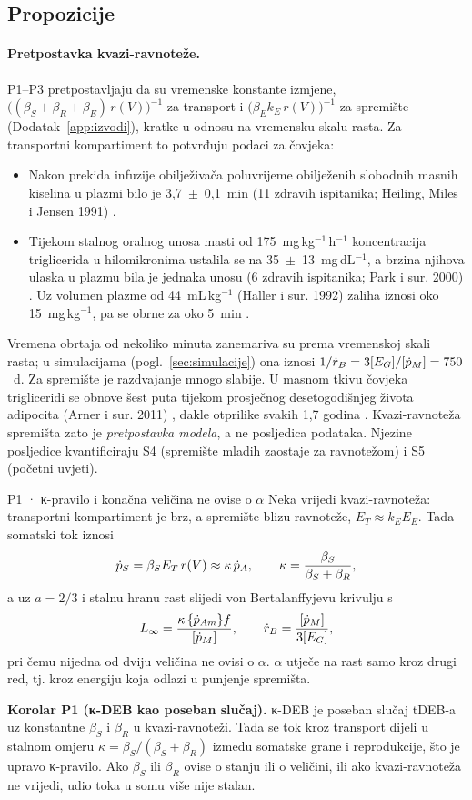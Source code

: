 \subsection{Propozicije}

\paragraph{Pretpostavka kvazi-ravnoteže.} P1–P3 pretpostavljaju da su vremenske konstante izmjene, $\big((\beta_S+\beta_R+\beta_E)\,r(V)\big)^{-1}$ za transport i $\big(\beta_E k_E\,r(V)\big)^{-1}$ za spremište (Dodatak~\ref{app:izvodi}), kratke u odnosu na vremensku skalu rasta. Za transportni kompartiment to potvrđuju podaci za čovjeka:
\begin{itemize}
\item Nakon prekida infuzije obilježivača poluvrijeme obilježenih slobodnih masnih kiselina u plazmi bilo je 3,7~$\pm$~0,1~min (11 zdravih ispitanika; Heiling, Miles i Jensen 1991) .
\item Tijekom stalnog oralnog unosa masti od 175~mg\,kg$^{-1}$\,h$^{-1}$ koncentracija triglicerida u hilomikronima ustalila se na 35~$\pm$~13~mg\,dL$^{-1}$, a brzina njihova ulaska u plazmu bila je jednaka unosu (6 zdravih ispitanika; Park i sur. 2000) . Uz volumen plazme od 44~mL\,kg$^{-1}$ (Haller i sur. 1992)  zaliha iznosi oko 15~mg\,kg$^{-1}$, pa se obrne za oko 5~min .
\end{itemize}
Vremena obrtaja od nekoliko minuta zanemariva su prema vremenskoj skali rasta; u simulacijama (pogl.~\ref{sec:simulacije}) ona iznosi $1/\dot r_B=3[E_G]/[\dot p_M]=750$~d. Za spremište je razdvajanje mnogo slabije. U masnom tkivu čovjeka trigliceridi se obnove šest puta tijekom prosječnog desetogodišnjeg života adipocita (Arner i sur. 2011) , dakle otprilike svakih 1,7 godina . Kvazi-ravnoteža spremišta zato je \emph{pretpostavka modela}, a ne posljedica podataka. Njezine posljedice kvantificiraju S4 (spremište mladih zaostaje za ravnotežom) i S5 (početni uvjeti).

\begin{propozicija}{P1 · κ-pravilo i konačna veličina ne ovise o $\alpha$}
Neka vrijedi kvazi-ravnoteža: transportni kompartiment je brz, a spremište blizu ravnoteže, $E_T\approx k_E E_E$. Tada somatski tok iznosi
\[
\dot{p}_S=\beta_S E_T\, r(V)\approx\kappa\,\dot{p}_A,\qquad \kappa=\frac{\beta_S}{\beta_S+\beta_R},
\]
a uz $a=2/3$ i stalnu hranu rast slijedi von Bertalanffyjevu krivulju s
\[
L_\infty=\frac{\kappa\,\{\dot p_{Am}\} f}{[\dot p_M]},\qquad \dot r_B=\frac{[\dot p_M]}{3[E_G]},
\]
pri čemu nijedna od dviju veličina ne ovisi o $\alpha$. $\alpha$ utječe na rast samo kroz drugi red, tj. kroz energiju koja odlazi u punjenje spremišta.
\end{propozicija}
\textbf{Korolar P1 (κ-DEB kao poseban slučaj).} κ-DEB je poseban slučaj tDEB-a uz konstantne $\beta_S$ i $\beta_R$ u kvazi-ravnoteži. Tada se tok kroz transport dijeli u stalnom omjeru $\kappa=\beta_S/(\beta_S+\beta_R)$ između somatske grane i reprodukcije, što je upravo κ-pravilo. Ako $\beta_S$ ili $\beta_R$ ovise o stanju ili o veličini, ili ako kvazi-ravnoteža ne vrijedi, udio toka u somu više nije stalan.

